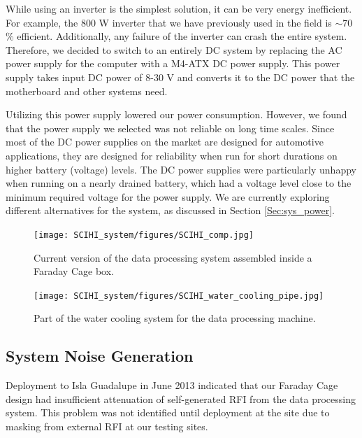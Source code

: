 While using an inverter is the simplest solution, it can be very energy inefficient. For example, the 800 W inverter that we have previously used in the field is $\sim70$\% efficient. Additionally, any failure of the inverter can crash the entire system. Therefore, we decided to switch to an entirely DC system by replacing the AC power supply for the computer with a M4-ATX DC power supply. This power supply takes input DC power of 8-30 V and converts it to the DC power that the motherboard and other systems need. 

Utilizing this power supply lowered our power consumption. However, we found that the power supply we selected was not reliable on long time scales. Since most of the DC power supplies on the market are designed for automotive applications, they are designed for reliability when run for short durations on higher battery (voltage) levels. The DC power supplies were particularly unhappy when running on a nearly drained battery, which had a voltage level close to the minimum required voltage for the power supply. We are currently exploring different alternatives for the system, as discussed in Section \ref{Sec:sys_power}. 

\begin{figure}[htb]
\centering
\begin{minipage}[b]{0.52\textwidth}
\centering
\texttt{[image: SCIHI\_system/figures/SCIHI\_comp.jpg]}
\caption{Current version of the data processing system assembled inside a Faraday Cage box.}
\label{Fig:new_comp}
\end{minipage}%
\begin{minipage}[b]{0.02\textwidth}
\hspace{1cm}
\end{minipage}%
\begin{minipage}[b]{0.42\textwidth}
\centering
\texttt{[image: SCIHI\_system/figures/SCIHI\_water\_cooling\_pipe.jpg]}
\caption{Part of the water cooling system for the data processing machine.}
\label{Fig:water_pipe}
\end{minipage}
\end{figure}


\subsection{System Noise Generation} \label{Sec:sys_noise}

Deployment to Isla Guadalupe in June 2013 indicated that our Faraday Cage design had insufficient attenuation of self-generated RFI from the data processing system. This problem was not identified until deployment at the site due to masking from external RFI at our testing sites. 

